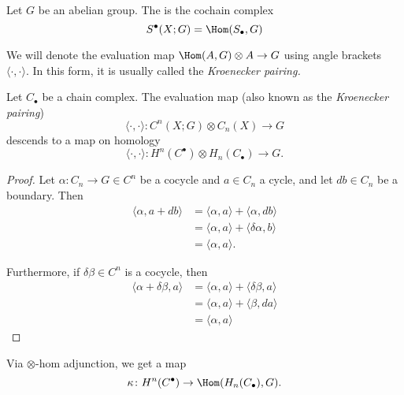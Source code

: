 \documentclass[main.tex]{subfiles}
\begin{document}
\begin{definition}
  \label{def:singular_cohomology}
  Let $G$ be an abelian group. The  is the cochain complex
  \begin{equation*}
    S^{\bullet}(X; G) = \Hom(S_{\bullet}, G)
  \end{equation*}
\end{definition}

We will denote the evaluation map $\Hom(A, G) \otimes A \to G$ using angle brackets $\langle \cdot,\cdot \rangle$. In this form, it is usually called the \emph{Kroenecker pairing.}

\begin{lemma}
  \label{lemma:kroenecker_pairing_descends_to_homology}
  Let $C_{\bullet}$ be a chain complex. The evaluation map (also known as the \emph{Kroenecker pairing})
  \begin{equation*}
    \langle \cdot,\cdot \rangle\colon C^{n}(X; G) \otimes C_{n}(X) \to G
  \end{equation*}
  descends to a map on homology
  \begin{equation*}
    \langle \cdot,\cdot \rangle\colon H^{n}(C^{\bullet}) \otimes H_{n}(C_{\bullet}) \to G.
  \end{equation*}
\end{lemma}
\begin{proof}
  Let $\alpha\colon C_{n} \to G \in C^{n}$ be a cocycle and $a \in C_{n}$ a cycle, and let $d b \in C_{n}$ be a boundary. Then
  \begin{align*}
    \langle \alpha, a + db \rangle &= \langle \alpha, a \rangle + \langle \alpha, db \rangle \\
    &= \langle \alpha, a \rangle + \langle \delta \alpha, b \rangle \\
    &= \langle \alpha, a \rangle.
  \end{align*}

  Furthermore, if $\delta \beta \in C^{n}$ is a cocycle, then
  \begin{align*}
    \langle \alpha + \delta \beta, a \rangle &= \langle \alpha, a \rangle + \langle \delta \beta, a \rangle \\
    &= \langle \alpha, a \rangle + \langle \beta, d a \rangle \\
    &= \langle \alpha, a \rangle
  \end{align*}
\end{proof}

Via $\otimes$-hom adjunction, we get a map
\begin{equation*}
  \kappa\colon H^{n}(C^{\bullet}) \to \Hom(H_{n}(C_{\bullet}), G).
\end{equation*}
\end{document}
